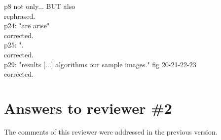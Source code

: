 \documentclass[a4paper,10pt]{report}
\begin{document}
\que p8 not only... BUT also\\
\ans rephrased.\\

\que p24: "are arise"\\
\ans corrected.\\

\que p25: ".\\
\ans corrected.\\

\que p29: "results [...] algorithms our sample images." fig 20-21-22-23\\
\ans corrected.\\

\chapter{Answers to reviewer \#2}

The comments of this reviewer were addressed in the previous version.\\



\end{document}
